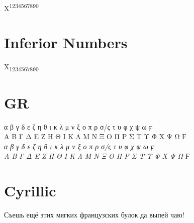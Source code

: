 \documentclass[a4paper]{article}
\begin{document}
X\textsuperscript{1234567890}

\section*{Inferior Numbers}

X\textsubscript{1234567890}

\section*{GR}

 α β γ δ ε ζ η θ ι κ λ μ ν ξ ο π ρ σ/ς τ υ φ χ ψ ω ϝ \\
 Α Β Γ Δ Ε Ζ Η Θ Ι Κ Λ Μ Ν Ξ Ο Π Ρ Σ Τ Υ Φ Χ Ψ Ω Ϝ\\
\textit{ α β γ δ ε ζ η θ ι κ λ μ ν ξ ο π ρ σ/ς τ υ φ χ ψ ω ϝ\\
 Α Β Γ Δ Ε Ζ Η Θ Ι Κ Λ Μ Ν Ξ Ο Π Ρ Σ Τ Υ Φ Χ Ψ Ω Ϝ}\par

\section*{Cyrillic}

Съешь ещё этих мягких французских булок да
выпей чаю!\par
\end{document}
